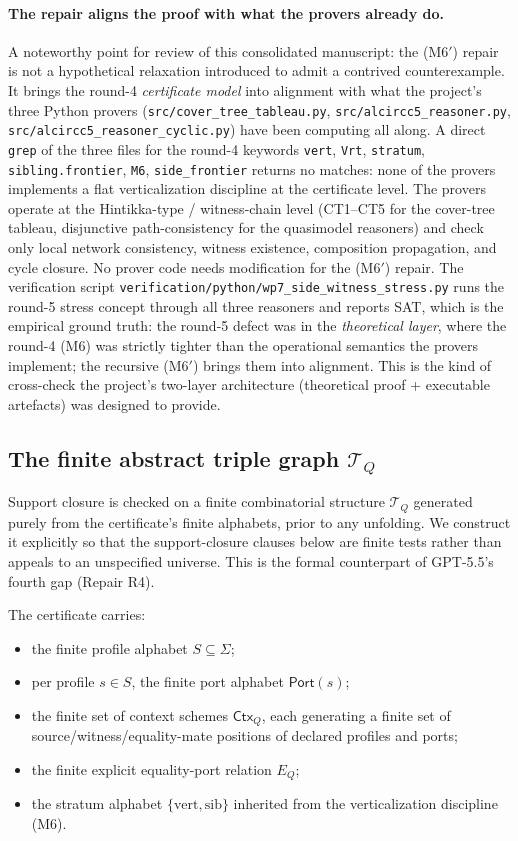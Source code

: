 \documentclass[11pt]{article}
\newcommand{\Ctx}{\mathsf{Ctx}}
\newcommand{\Port}{\mathsf{Port}}
\newcommand{\vertical}{\mathrm{vert}}
\newcommand{\sibling}{\mathrm{sib}}
\begin{document}
\paragraph{The repair aligns the proof with what the provers
already do.}  A noteworthy point for review of this consolidated
manuscript: the (M6$'$) repair is not a hypothetical relaxation
introduced to admit a contrived counterexample.  It brings the
round-4 \emph{certificate model} into alignment with what the
project's three Python provers (\texttt{src/cover\_tree\_tableau.py},
\texttt{src/alcircc5\_reasoner.py},
\texttt{src/alcircc5\_reasoner\_cyclic.py}) have been computing all
along.  A direct \texttt{grep} of the three files for the round-4
keywords \texttt{vert}, \texttt{Vrt}, \texttt{stratum},
\texttt{sibling.frontier}, \texttt{M6}, \texttt{side\_frontier}
returns no matches: none of the provers implements a flat
verticalization discipline at the certificate level.  The provers
operate at the Hintikka-type / witness-chain level (CT1--CT5 for
the cover-tree tableau, disjunctive path-consistency for the
quasimodel reasoners) and check only local network consistency,
witness existence, composition propagation, and cycle closure.  No
prover code needs modification for the (M6$'$) repair.  The
verification script
\texttt{verification/python/wp7\_side\_witness\_stress.py} runs the
round-5 stress concept through all three reasoners and reports SAT,
which is the empirical ground truth: the round-5 defect was in the
\emph{theoretical layer}, where the round-4 (M6) was strictly
tighter than the operational semantics the provers implement; the
recursive (M6$'$) brings them into alignment.  This is the kind of
cross-check the project's two-layer architecture (theoretical
proof + executable artefacts) was designed to provide.

\subsection{The finite abstract triple graph $\mathcal T_Q$}
\label{ssec:abstract-triples}

Support closure is checked on a finite combinatorial structure
$\mathcal T_Q$ generated purely from the certificate's finite
alphabets, prior to any unfolding.  We construct it explicitly so
that the support-closure clauses below are finite tests rather than
appeals to an unspecified universe.  This is the formal counterpart
of GPT-5.5's fourth gap (Repair R4).

The certificate carries:
\begin{itemize}
\item the finite profile alphabet $S\subseteq\Sigma$;
\item per profile $s\in S$, the finite port alphabet $\Port(s)$;
\item the finite set of context schemes $\Ctx_Q$, each generating a
finite set of source/witness/equality-mate positions of declared
profiles and ports;
\item the finite explicit equality-port relation $E_Q$;
\item the stratum alphabet $\{\vertical,\sibling\}$ inherited from
the verticalization discipline (M6).
\end{itemize}
\end{document}
